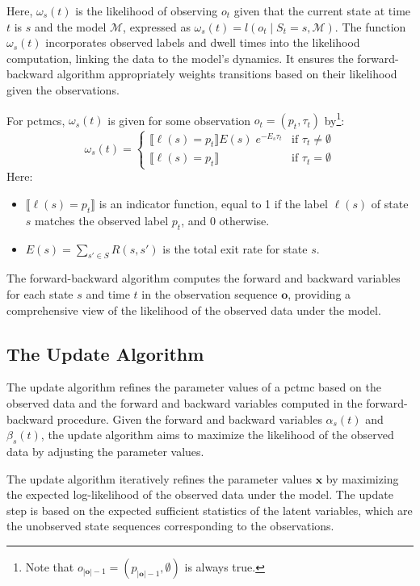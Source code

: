 Here, $\omega_{s}(t)$ is the likelihood of observing $o_t$ given that the current state at time $t$ is $s$ and the model $\mathcal{M}$, expressed as $\omega_s(t) = l(o_t \mid S_t = s, \mathcal{M})$. 
The function $\omega_s(t)$ incorporates observed labels and dwell times into the likelihood computation, linking the data to the model's dynamics. It ensures the forward-backward algorithm appropriately weights transitions based on their likelihood given the observations. 

For \glspl{pctmc}, $\omega_{s}(t)$ is given for some observation $o_t = (p_t, \tau_t)$ by\footnote{Note that $o_{|\mathbf{o}|-1} = (p_{|\mathbf{o}|-1}, \emptyset)$ is always true.}: 
\begin{equation} 
    \omega_s(t) = 
    \begin{cases} 
        \llbracket \ell(s) = p_t \rrbracket E(s) \; e^{-E_s\tau_t} & \text{if } \tau_t \neq \emptyset \\ 
        \llbracket \ell(s) = p_t \rrbracket & \text{if } \tau_t = \emptyset 
    \end{cases}
    \label{eq:equation10} 
\end{equation}
Here:
\begin{itemize}
    \item $\llbracket \ell(s) = p_t \rrbracket$ is an indicator function, equal to 1 if the label $\ell(s)$ of state $s$ matches the observed label $p_t$, and 0 otherwise.
    \item $E(s) = \sum_{s' \in S} R(s, s')$ is the total exit rate for state $s$.
\end{itemize}

The forward-backward algorithm computes the forward and backward variables for each state $s$ and time $t$ in the observation sequence $\mathbf{o}$, providing a comprehensive view of the likelihood of the observed data under the model.

\subsection{The Update Algorithm}\label{subsec:update-algorithm}
The update algorithm refines the parameter values of a \gls{pctmc} based on the observed data and the forward and backward variables computed in the forward-backward procedure.
Given the forward and backward variables $\alpha_s(t)$ and $\beta_s(t)$, the update algorithm aims to maximize the likelihood of the observed data by adjusting the parameter values.

The update algorithm iteratively refines the parameter values $\mathbf{x}$ by maximizing the expected log-likelihood of the observed data under the model. The update step is based on the expected sufficient statistics of the latent variables, which are the unobserved state sequences corresponding to the observations.

